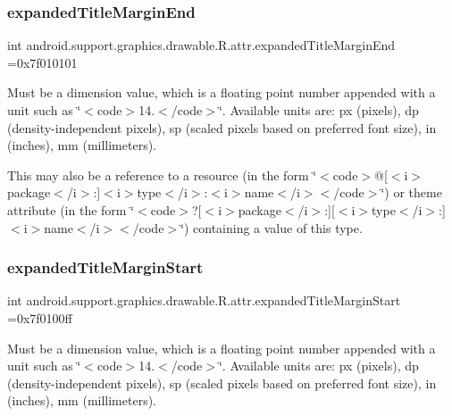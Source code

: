 \subsubsection{\texorpdfstring{expanded\+Title\+Margin\+End}{expandedTitleMarginEnd}}
{\footnotesize\ttfamily int android.\+support.\+graphics.\+drawable.\+R.\+attr.\+expanded\+Title\+Margin\+End =0x7f010101\hspace{0.3cm}{\ttfamily [static]}}

Must be a dimension value, which is a floating point number appended with a unit such as \char`\"{}$<$code$>$14.\+5sp$<$/code$>$\char`\"{}. Available units are\+: px (pixels), dp (density-\/independent pixels), sp (scaled pixels based on preferred font size), in (inches), mm (millimeters). 

This may also be a reference to a resource (in the form \char`\"{}$<$code$>$@\mbox{[}$<$i$>$package$<$/i$>$\+:\mbox{]}$<$i$>$type$<$/i$>$\+:$<$i$>$name$<$/i$>$$<$/code$>$\char`\"{}) or theme attribute (in the form \char`\"{}$<$code$>$?\mbox{[}$<$i$>$package$<$/i$>$\+:\mbox{]}\mbox{[}$<$i$>$type$<$/i$>$\+:\mbox{]}$<$i$>$name$<$/i$>$$<$/code$>$\char`\"{}) containing a value of this type. \mbox{\label{classandroid_1_1support_1_1graphics_1_1drawable_1_1R_1_1attr_aef2bbf1973c8562d1a0c5546601aa88a}} 
\subsubsection{\texorpdfstring{expanded\+Title\+Margin\+Start}{expandedTitleMarginStart}}
{\footnotesize\ttfamily int android.\+support.\+graphics.\+drawable.\+R.\+attr.\+expanded\+Title\+Margin\+Start =0x7f0100ff\hspace{0.3cm}{\ttfamily [static]}}

Must be a dimension value, which is a floating point number appended with a unit such as \char`\"{}$<$code$>$14.\+5sp$<$/code$>$\char`\"{}. Available units are\+: px (pixels), dp (density-\/independent pixels), sp (scaled pixels based on preferred font size), in (inches), mm (millimeters). 

